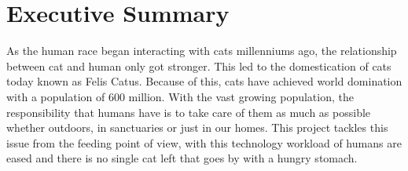 \section{Executive Summary} \label{sec:exec_sum}

As the human race began interacting with cats millenniums ago, the relationship between cat and human only got stronger. This led to the domestication of cats today known as Felis Catus. Because of this, cats have achieved world domination with a population of 600 million. With the vast growing population, the responsibility that humans have is to take care of them as much as possible whether outdoors, in sanctuaries or just in our homes. This project tackles this issue from the feeding point of view, with this technology workload of humans are eased and there is no single cat left that goes by with a hungry stomach.

